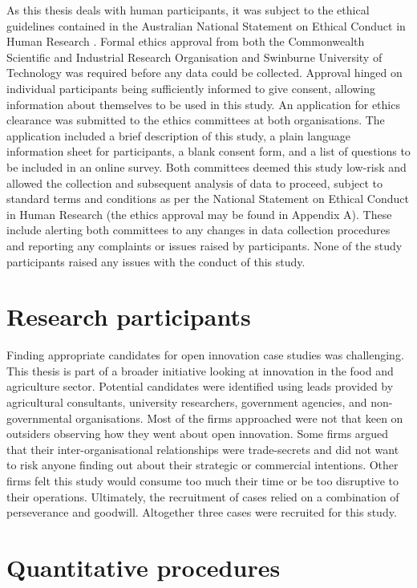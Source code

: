 As this thesis deals with human participants, it was subject to the ethical guidelines contained in the Australian National Statement on Ethical Conduct in Human Research \citep{national2014national}. Formal ethics approval from both the Commonwealth Scientific and Industrial Research Organisation and Swinburne University of Technology was required before any data could be collected. Approval hinged on individual participants being sufficiently informed to give consent, allowing information about themselves to be used in this study. An application for ethics clearance was submitted to the ethics committees at both organisations. The application included a brief description of this study, a plain language information sheet for participants, a blank consent form, and a list of questions to be included in an online survey. Both committees deemed this study low-risk and allowed the collection and subsequent analysis of data to proceed, subject to standard terms and conditions as per the National Statement on Ethical Conduct in Human Research (the ethics approval may be found in Appendix A). These include alerting both committees to any changes in data collection procedures and reporting any complaints or issues raised by participants. None of the study participants raised any issues with the conduct of this study. 

\section{Research participants}

Finding appropriate candidates for open innovation case studies was challenging. This thesis is part of a broader initiative looking at innovation in the food and agriculture sector. Potential candidates were identified using leads provided by agricultural consultants, university researchers, government agencies, and non-governmental organisations. Most of the firms approached were not that keen on outsiders observing how they went about open innovation. Some firms argued that their inter-organisational relationships were trade-secrets and did not want to risk anyone finding out about their strategic or commercial intentions. Other firms felt this study would consume too much their time or be too disruptive to their operations. Ultimately, the recruitment of cases relied on a combination of perseverance and goodwill. Altogether three cases were recruited for this study. 

\section{Quantitative procedures}

